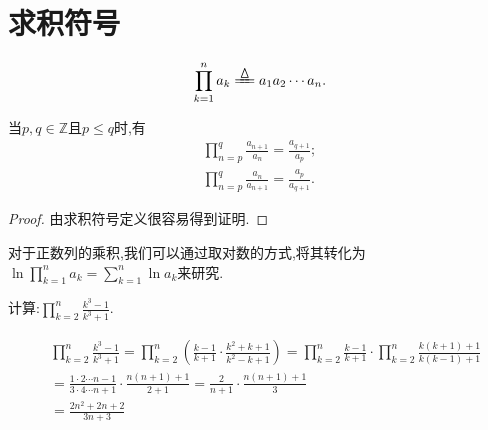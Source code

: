 \documentclass[../../main.tex]{subfiles}%
\begin{document}
\section{求积符号}

\begin{definition}[求积符号]\label{definition:求积符号}
\begin{align*}
\prod_{k=1}^n{a_k}\xlongequal{\bigtriangleup}a_1a_2\cdots a_n. 
\end{align*}
\end{definition}

\begin{theorem}[基本结论]\label{theorem:求积符号基本结论}
当$p,q\in \mathbb{Z}$且$p\leqslant  q$时,有
\begin{gather*}
\prod_{n=p}^q{\frac{a_{n+1}}{a_n}}=\frac{a_{q+1}}{a_p};
\\
\prod_{n=p}^q{\frac{a_n}{a_{n+1}}}=\frac{a_p}{a_{q+1}}.
\end{gather*}
\end{theorem}
\begin{proof}

由求积符号定义很容易得到证明.

\end{proof}
\begin{remark}
对于正数列的乘积,我们可以通过取对数的方式,将其转化为$\ln \prod_{k=1}^n{a_k}=\sum\limits_{k=1}^n{\ln a_k}$来研究.
\end{remark}
\begin{example}
计算:$\prod_{k=2}^n{\frac{k^3-1}{k^3+1}}$.
\end{example}
\begin{solution}

\begin{align*}
&\prod_{k=2}^n{\frac{k^3-1}{k^3+1}}=\prod_{k=2}^n{\left( \frac{k-1}{k+1}\cdot \frac{k^2+k+1}{k^2-k+1} \right)}=\prod_{k=2}^n{\frac{k-1}{k+1}\cdot}\prod_{k=2}^n{\frac{k\left( k+1 \right) +1}{k\left( k-1 \right) +1}}
\\
&=\frac{1\cdot 2\cdots n-1}{3\cdot 4\cdots n+1}\cdot \frac{n\left( n+1 \right) +1}{2+1}=\frac{2}{n+1}\cdot \frac{n\left( n+1 \right) +1}{3}
\\
&=\frac{2n^2+2n+2}{3n+3}
\end{align*}

\end{solution}
\end{document}
